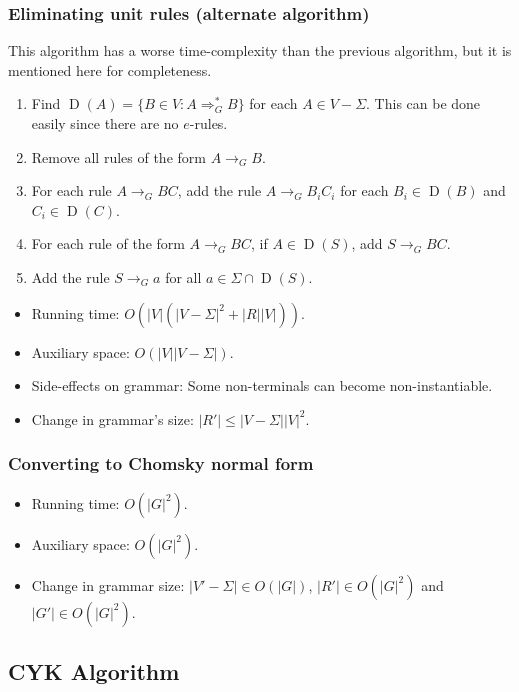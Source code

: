 \subsubsection{Eliminating unit rules (alternate algorithm)}

This algorithm has a worse time-complexity than the previous algorithm,
but it is mentioned here for completeness.

\begin{enumerate}
\item Find $\operatorname{D}(A) = \{B \in V: A \Rightarrow_G^* B\}$ for each $A \in V-\Sigma$.
    This can be done easily since there are no $e$-rules.
\item Remove all rules of the form $A \rightarrow_G B$.
\item For each rule $A \rightarrow_G BC$, add the rule
    $A \rightarrow_G B_iC_i$ for each $B_i \in \operatorname{D}(B)$ and $C_i \in \operatorname{D}(C)$.
\item For each rule of the form $A \rightarrow_G BC$, if $A \in \operatorname{D}(S)$,
    add $S \rightarrow_G BC$.
\item Add the rule $S \rightarrow_G a$ for all $a \in \Sigma \cap \operatorname{D}(S)$.
\end{enumerate}

\begin{itemize}
\item Running time: $O(|V|(|V-\Sigma|^2 + |R||V|))$.
\item Auxiliary space: $O(|V||V-\Sigma|)$.
\item Side-effects on grammar: Some non-terminals can become non-instantiable.
\item Change in grammar's size: $|R'| \le |V-\Sigma||V|^2$.
\end{itemize}

\subsubsection{Converting to Chomsky normal form}

\begin{itemize}
\item Running time: $O(|G|^2)$.
\item Auxiliary space: $O(|G|^2)$.
\item Change in grammar size: $|V'-\Sigma| \in O(|G|)$, $|R'| \in O(|G|^2)$ and $|G'| \in O(|G|^2)$.
\end{itemize}

\subsection{CYK Algorithm}

